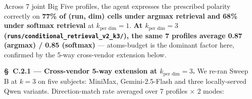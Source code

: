 \begin{table}[t]
\centering
{}
\caption{Sweep B: joint Big Five composition with one endpoint polarity per dimension ($\pi_d \in \{0,1\}$), 7 representative profiles. Direction-match rate (fraction of (run $\times$ dim) cells where the per-dim Mini-IPIP score moves $\geq 0.25$ in the prescribed polarity) at $k_\text{per dim} = 1$.}
\label{tab:joint-uniform}
\end{table}

Across 7 joint Big Five profiles, the agent expresses the prescribed polarity correctly on \textbf{77\% of (run, dim) cells under argmax retrieval and 68\% under softmax retrieval} at $k_\text{per dim} = 1$. \textbf{At $k_\text{per dim} = 3$ (\texttt{runs/\allowbreak{}conditional\_\allowbreak{}retrieval\_\allowbreak{}v2\_\allowbreak{}k3/\allowbreak{}}), the same 7 profiles average 0.87 (argmax) / 0.85 (softmax)} --- atoms-budget is the dominant factor here, confirmed by the 5-way cross-vendor extension below.

\label{app:C.2.1}
\textbf{\S~C.2.1 --- Cross-vendor 5-way extension at $k_\text{per dim} = 3$.} We re-ran Sweep B at $k = 3$ on five subjects: MiniMax, Gemini-2.5-Flash and three locally-served Qwen variants. Direction-match rate averaged over 7 profiles $\times$ 2 modes:

